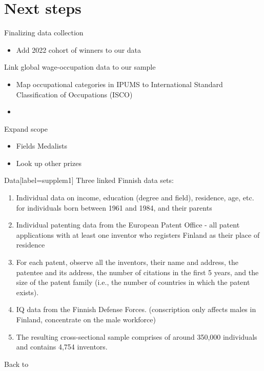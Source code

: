 \section{Next steps}
\label{"waiting for reftex-label call..."}

\begin{frame}{Finalizing data collection}
\begin{itemize}
\item Add 2022 cohort of winners to our data

\end{itemize}
\end{frame}

\begin{frame}{Link global wage-occupation data to our sample}
  \begin{itemize}
  \item Map occupational categories in IPUMS to International Standard Classification of Occupations (ISCO) 
\item 
  \end{itemize}
\end{frame}

\begin{frame}{Expand scope}

  \begin{itemize}
  \item Fields Medalists
    \item Look up other prizes 
  \end{itemize}
\end{frame}



\appendix

\begin{frame}{Data}[label=supplem1]
  Three linked Finnish data sets: \\
\begin{enumerate}
\item Individual data on income, education (degree and field), residence, age, etc. for individuals born between 1961 and 1984, and their parents
\item Individual patenting data from the European Patent Office - all patent applications with at least one inventor who registers Finland as their place of residence
\item  For each patent, observe all the inventors, their name and address, the patentee and its address, the number of citations in the first 5 years, and the size of the patent family (i.e., the number of countries in which the patent exists).
\item IQ data from the Finnish Defense Forces. (conscription only affects males in Finland, concentrate on the male workforce)
\item The resulting cross-sectional sample comprises of around 350,000 individuals and contains 4,754 inventors.
\end{enumerate}

Back to \hyperlink{main}{}
\end{frame}


